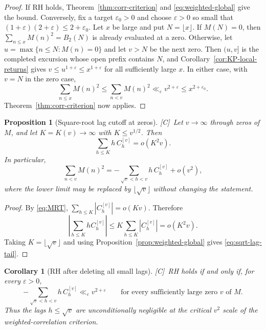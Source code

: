 \documentclass[11pt]{amsart}
\numberwithin{equation}{section}
\theoremstyle{plain}
\newtheorem{proposition}[theorem]{Proposition}
\newtheorem{corollary}[theorem]{Corollary}
\theoremstyle{definition}
\theoremstyle{remark}
\newcommand{\eps}{\varepsilon}
\newcommand{\tagC}{\textup{[C]}}
\begin{document}
\begin{proof}
If RH holds, Theorem~\ref{thm:corr-criterion} and
\eqref{eq:weighted-global} give the bound. Conversely, fix a target
$\eps_0>0$ and choose $\eps>0$ so small that
$(1+\eps)(2+\eps)\le2+\eps_0$. Let $x$ be large and put $N=\lfloor x\rfloor$.  If $M(N)=0$, then
$\sum_{n\le x}M(n)^2=B_2(N)$ is already evaluated at a zero.  Otherwise,
let $u=\max\{n\le N:M(n)=0\}$ and let $v> N$ be the next zero.  Then
$(u,v]$ is the completed excursion whose open prefix contains $N$, and
Corollary~\ref{cor:KP-local-returns} gives
$v\le u^{1+\eps}\le x^{1+\eps}$ for all sufficiently large $x$.  In
either case, with $v=N$ in the zero case,
\[
\sum_{n\le x}M(n)^2\le\sum_{n<v}M(n)^2
\ll_\eps v^{2+\eps}\le x^{2+\eps_0}.
\]
Theorem~\ref{thm:corr-criterion} now applies.
\end{proof}

\begin{proposition}[Square-root lag cutoff at zeros]
\label{prop:sqrt-lag-cutoff}
\tagC\ Let $v\to\infty$ through zeros of $M$, and let $K=K(v)\to\infty$ with
$K\le v^{1/2}$. Then
\begin{equation}
\label{eq:small-lag-weighted}
\sum_{h\le K}h\,C_h^{[v]}=o(K^2v).
\end{equation}
In particular,
\begin{equation}
\label{eq:sqrt-lag-tail}
\sum_{n<v}M(n)^2
=-\sum_{\sqrt v<h<v}h\,C_h^{[v]}+o(v^2),
\end{equation}
where the lower limit may be replaced by $\lfloor\sqrt v\rfloor$ without
changing the statement.
\end{proposition}

\begin{proof}
By \eqref{eq:MRT},
$\sum_{h\le K}|C_h^{[v]}|=o(Kv)$. Therefore
\[
\left|\sum_{h\le K}hC_h^{[v]}\right|
\le K\sum_{h\le K}|C_h^{[v]}|=o(K^2v).
\]
Taking $K=\lfloor\sqrt v\rfloor$ and using
Proposition~\ref{prop:weighted-global} gives \eqref{eq:sqrt-lag-tail}.
\end{proof}

\begin{corollary}[RH after deleting all small lags]
\label{cor:RH-large-lags}
\tagC\ RH holds if and only if, for every $\eps>0$,
\[
-\sum_{\sqrt v<h<v}h\,C_h^{[v]}\ll_\eps v^{2+\eps}
\qquad\text{for every sufficiently large zero $v$ of $M$.}
\]
Thus the lags $h\le\sqrt v$ are unconditionally negligible at the critical
$v^2$ scale of the weighted-correlation criterion.
\end{corollary}
\end{document}
